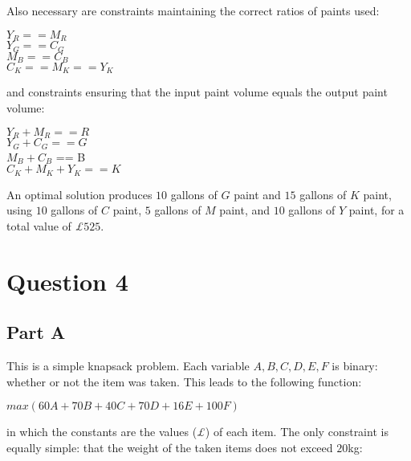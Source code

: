 \documentclass[11pt]{article} %
\begin{document}
Also necessary are constraints maintaining the correct ratios of paints used:

\begin{center}

$Y_R == M_R$ \\
$Y_G == C_G$ \\
$M_B == C_B$ \\
$C_K == M_K == Y_K$ \\

\end{center}

and constraints ensuring that the input paint volume equals the output paint volume:

\begin{center}

$Y_R + M_R ==  R$ \\
$Y_G + C_G == G$ \\
$M_B + C_B$ == B \\
$C_K + M_K + Y_K == K$ \\

\end{center}

An optimal solution produces $10$ gallons of $G$ paint and $15$ gallons of $K$ paint, using $10$ gallons of $C$ paint, $5$ gallons of $M$ paint, and $10$ gallons of $Y$ paint, for a total value of \textit{£}$525$.

\clearpage

\section*{Question 4}

\subsection*{Part A} 

This is a simple knapsack problem. Each variable $A, B, C, D, E, F$ is binary: whether or not the item was taken. This leads to the following function:

\begin{center}

$max (60A + 70B + 40C + 70D + 16E + 100F)$

\end{center}

in which the constants are the values (\textit{£}) of each item. The only constraint is equally simple: that the weight of the taken items does not exceed $20$kg:
\end{document}

